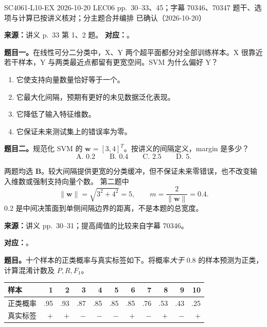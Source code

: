 

\examplemeta
  {SC4061-L10-EX}
  {2026-10-20}
  {LEC06 pp.~30--33、45；字幕 70346、70347}
  {题干、选项与计算已按讲义核对；分主题合并编排}
  {已确认（2026-10-20）}

\nopagebreak[4]

\textbf{来源：}讲义 p.~33 第 1、2 题。
\textbf{对应：}。

\textbf{题目一。}在线性可分二分类中，X、Y 两个超平面都分对全部训练样本。X 很靠近若干样本，Y 与两类最近点都留有更宽空间。SVM 为什么偏好 Y？
\begin{enumerate}[label=\Alph*.,nosep]
  \item 它使支持向量数量恰好等于一个。
  \item 它最大化间隔，预期有更好的未见数据泛化表现。
  \item 它降低了输入特征维数。
  \item 它保证未来测试集上的错误率为零。
\end{enumerate}

\textbf{题目二。}规范化 SVM 的 $\bm w=[3,4]^T$。按讲义的间隔定义，margin 是多少？
\[
  \text{A. }0.2\qquad
  \text{B. }0.4\qquad
  \text{C. }2.5\qquad
  \text{D. }5.
\]

\begin{checkedsolution}
两题均选 \textbf{B}。较大间隔提供更宽的分类缓冲，但不保证未来零错误，也不改变输入维数或强制支持向量个数。
第二题中
\[
  \|\bm w\|=\sqrt{3^2+4^2}=5,\qquad
  m=\frac2{\|\bm w\|}=\boxed{0.4}.
\]
$0.2$ 是中间决策面到单侧间隔边界的距离，不是本题的总宽度。
\end{checkedsolution}

\nopagebreak[4]

\textbf{来源：}讲义 pp.~30--31；提高阈值的比较来自字幕 70346。

\textbf{对应：}。

\textbf{题目。}十个样本的正类概率与真实标签如下。将概率\emph{大于} $0.8$ 的样本预测为正类，计算混淆计数及 $P,R,F_1$。
\begin{center}
\small
\setlength{\tabcolsep}{4pt}
\begin{tabular}{@{}lrrrrrrrrrr@{}}
  \toprule
  样本 & 1 & 2 & 3 & 4 & 5 & 6 & 7 & 8 & 9 & 10 \\
  \midrule
  正类概率 & .95 & .93 & .87 & .85 & .85 & .85 & .76 & .53 & .43 & .25 \\
  真实标签 & $+$ & $+$ & $-$ & $-$ & $-$ & $+$ & $-$ & $+$ & $-$ & $+$ \\
  \bottomrule
\end{tabular}
\end{center}

